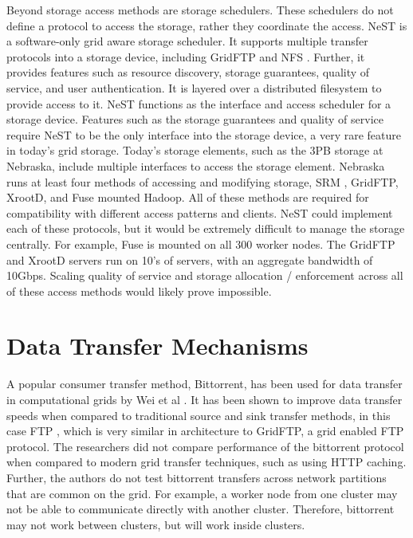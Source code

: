 Beyond storage access methods are storage schedulers.  These schedulers do not define a protocol to access the storage, rather they coordinate the access.  NeST \cite{bent2002flexibility} is a software-only grid aware storage scheduler.  It supports multiple transfer protocols into a storage device, including GridFTP \cite{allcock2005globus} and NFS \cite{walsh1985overview}.  Further, it provides features such as resource discovery, storage guarantees, quality of service, and user authentication.  It is layered over a distributed filesystem to provide access to it.  NeST functions as the interface and access scheduler for a storage device.  Features such as the storage guarantees and quality of service require NeST to be the only interface into the storage device, a very rare feature in today's grid storage.  Today's storage elements, such as the 3PB storage at Nebraska, include multiple interfaces to access the storage element.  Nebraska runs at least four \cite{attebury2009hadoop} methods of accessing and modifying storage, SRM \cite{shoshani2002storage}, GridFTP, XrootD, and Fuse \cite{szeredi2010fuse} mounted Hadoop.  All of these methods are required for compatibility with different access patterns and clients.  NeST could implement each of these protocols, but it would be extremely difficult to manage the storage centrally.  For example, Fuse is mounted on all 300 worker nodes.  The GridFTP and XrootD servers run on 10's of servers, with an aggregate bandwidth of 10Gbps.  Scaling quality of service and storage allocation / enforcement across all of these access methods would likely prove impossible.



\section{Data Transfer Mechanisms}

A popular consumer transfer method, Bittorrent, has been used for data transfer in computational grids by Wei et al \cite{wei2005collaborative, wei2005scheduling, wei2007towards}.  It has been shown to improve data transfer speeds when compared to traditional source and sink transfer methods, in this case FTP \cite{postel1985file}, which is very similar in architecture to GridFTP, a grid enabled FTP protocol.  The researchers did not compare performance of the bittorrent protocol when compared to modern grid transfer techniques, such as using HTTP caching.  Further, the authors do not test bittorrent transfers across network partitions that are common on the grid.  For example, a worker node from one cluster may not be able to communicate directly with another cluster.  Therefore, bittorrent may not work between clusters, but will work inside clusters.

